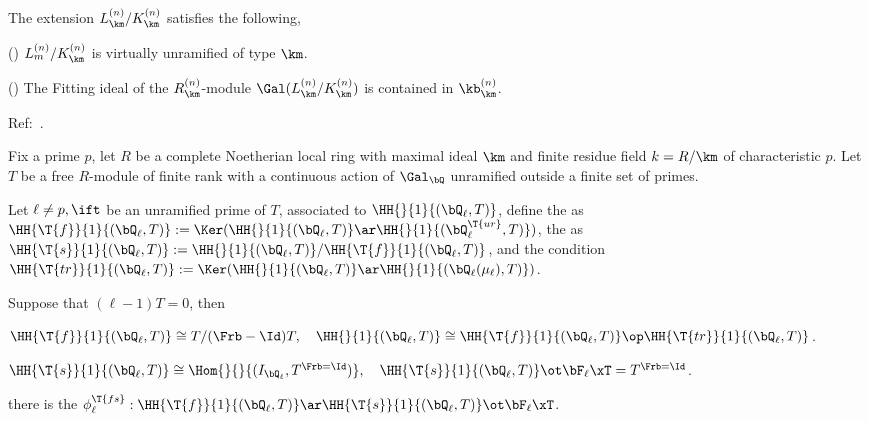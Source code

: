 \documentclass[article, a4paper, twoside]{universal}
\begin{document}
\begin{thm}
	The extension $L_{\km}^{(n)}/K_{\km}^{(n)}$ satisfies the following,
	\begin{itm}
		\item (\cite[5.4~Proposition~1]{MW1984}) $L_{m}^{(n)}/K_{\km}^{(n)}$ is virtually unramified of type $\km$.
		\item (\cite[5.5~Proposition~1]{MW1984}) The Fitting ideal of the $R_{\km}^{(n)}$-module $\Gal(L_{\km}^{(n)}/K_{\km}^{(n)})$ is contained in $\kb_{\km}^{(n)}$.
	\end{itm}
\end{thm}



\newpage
{}
Ref:~\cite{MR2004Kolyvagin}.

\begin{stp}
    Fix a prime $p$, let $R$ be a complete Noetherian local ring with maximal ideal $\km$ and finite residue field $k=R/\km$ of characteristic $p$. Let $T$ be a free $R$-module of finite rank with a continuous action of $\Gal_{\bQ}$ unramified outside a finite set of primes.
\end{stp}

\begin{dfn}[1.1.6]
    Let $\ell\neq p,\ift$ be an unramified prime of $T$, associated to $\HH{}{1}{(\bQ_{\ell},T)}$, define the  as $\HH{\T{f}}{1}{(\bQ_{\ell},T)}:=\Ker(\HH{}{1}{(\bQ_{\ell},T)}\ar\HH{}{1}{(\bQ_{\ell}^{\T{ur}},T)})$, the  as $\HH{\T{s}}{1}{(\bQ_{\ell},T)}:=\HH{}{1}{(\bQ_{\ell},T)}/\HH{\T{f}}{1}{(\bQ_{\ell},T)}$, and the  condition $\HH{\T{tr}}{1}{(\bQ_{\ell},T)}:=\Ker(\HH{}{1}{(\bQ_{\ell},T)}\ar\HH{}{1}{(\bQ_{\ell}(\mu_{\ell}),T)})$.

\end{dfn}

\begin{thm}[1.2.1, 1.2.2, 1.2.4]
    Suppose that $(\ell-1)T=0$, then
    \begin{itm}
        \item $\HH{\T{f}}{1}{(\bQ_{\ell},T)}\cong T/(\Frb-\Id)T,\quad \HH{}{1}{(\bQ_{\ell},T)}\cong\HH{\T{f}}{1}{(\bQ_{\ell},T)}\op\HH{\T{tr}}{1}{(\bQ_{\ell},T)}$.
        \item $\HH{\T{s}}{1}{(\bQ_{\ell},T)}\cong\Hom{}{}{(I_{\bQ_{\ell}},T^{\Frb=\Id})},\quad \HH{\T{s}}{1}{(\bQ_{\ell},T)}\ot\bF_{\ell}\xT=T^{\Frb=\Id}$.
        \item there is the  $\phi_{\ell}^{\T{fs}}:\HH{\T{f}}{1}{(\bQ_{\ell},T)}\ar\HH{\T{s}}{1}{(\bQ_{\ell},T)}\ot\bF_{\ell}\xT$.
    \end{itm}
\end{thm}
\end{document}
